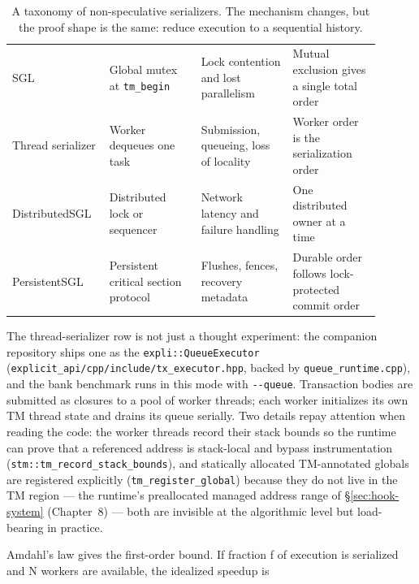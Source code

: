 \begin{table}[htbp]
\centering
\begin{tabular}{M{0.22\linewidth}M{0.23\linewidth}M{0.23\linewidth}M{0.22\linewidth}}
\hline
{} &  &  &  \\
\hline
SGL & Global mutex at \texttt{tm\_begin} & Lock contention and lost parallelism & Mutual exclusion gives a single total order \\
Thread serializer & Worker dequeues one task & Submission, queueing, loss of locality & Worker order is the serialization order \\
DistributedSGL & Distributed lock or sequencer & Network latency and failure handling & One distributed owner at a time \\
PersistentSGL & Persistent critical section protocol & Flushes, fences, recovery metadata & Durable order follows lock-protected commit order \\
\hline
\end{tabular}
\caption{A taxonomy of non-speculative serializers. The mechanism changes, but the proof shape is the same: reduce execution to a sequential history.}
\label{tab:nonspec-taxonomy}
\end{table}

The thread-serializer row is not just a thought experiment: the companion
repository ships one as the \texttt{expli::QueueExecutor}
(\texttt{explicit\_api/cpp/include/\allowbreak tx\_executor.hpp}, backed by
\texttt{queue\_runtime.cpp}), and the bank benchmark runs in this mode with
\texttt{-{}-queue}. Transaction bodies are submitted as closures to a pool of
worker threads; each worker initializes its own TM thread state and drains
its queue serially. Two details repay attention when reading the code: the
worker threads record their stack bounds so the runtime can prove that a
referenced address is stack-local and bypass instrumentation
(\texttt{stm::tm\_record\_\allowbreak stack\_\allowbreak bounds}), and statically allocated
TM-annotated globals are registered explicitly
(\texttt{tm\_register\_\allowbreak global})
because they do not live in the TM region --- the runtime's preallocated
managed address range of \S\ref{sec:hook-system} (Chapter~8) --- both are
invisible at the algorithmic level but load-bearing in practice.

Amdahl's law gives the first-order bound. If fraction f of execution is serialized and N workers are available, the idealized speedup is

